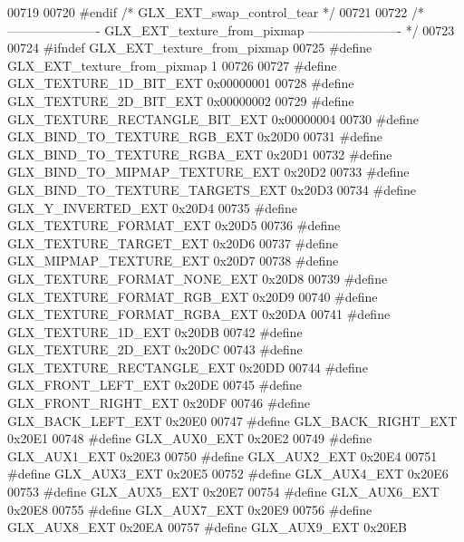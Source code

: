 \begin{DoxyCode}
00719 
00720 \textcolor{preprocessor}{#endif }\textcolor{comment}{/* GLX\_EXT\_swap\_control\_tear */}\textcolor{preprocessor}{}
00721 
00722 \textcolor{comment}{/* ---------------------- GLX\_EXT\_texture\_from\_pixmap ---------------------- */}
00723 
00724 \textcolor{preprocessor}{#ifndef GLX\_EXT\_texture\_from\_pixmap}
00725 \textcolor{preprocessor}{#define GLX\_EXT\_texture\_from\_pixmap 1}
00726 
00727 \textcolor{preprocessor}{#define GLX\_TEXTURE\_1D\_BIT\_EXT 0x00000001}
00728 \textcolor{preprocessor}{#define GLX\_TEXTURE\_2D\_BIT\_EXT 0x00000002}
00729 \textcolor{preprocessor}{#define GLX\_TEXTURE\_RECTANGLE\_BIT\_EXT 0x00000004}
00730 \textcolor{preprocessor}{#define GLX\_BIND\_TO\_TEXTURE\_RGB\_EXT 0x20D0}
00731 \textcolor{preprocessor}{#define GLX\_BIND\_TO\_TEXTURE\_RGBA\_EXT 0x20D1}
00732 \textcolor{preprocessor}{#define GLX\_BIND\_TO\_MIPMAP\_TEXTURE\_EXT 0x20D2}
00733 \textcolor{preprocessor}{#define GLX\_BIND\_TO\_TEXTURE\_TARGETS\_EXT 0x20D3}
00734 \textcolor{preprocessor}{#define GLX\_Y\_INVERTED\_EXT 0x20D4}
00735 \textcolor{preprocessor}{#define GLX\_TEXTURE\_FORMAT\_EXT 0x20D5}
00736 \textcolor{preprocessor}{#define GLX\_TEXTURE\_TARGET\_EXT 0x20D6}
00737 \textcolor{preprocessor}{#define GLX\_MIPMAP\_TEXTURE\_EXT 0x20D7}
00738 \textcolor{preprocessor}{#define GLX\_TEXTURE\_FORMAT\_NONE\_EXT 0x20D8}
00739 \textcolor{preprocessor}{#define GLX\_TEXTURE\_FORMAT\_RGB\_EXT 0x20D9}
00740 \textcolor{preprocessor}{#define GLX\_TEXTURE\_FORMAT\_RGBA\_EXT 0x20DA}
00741 \textcolor{preprocessor}{#define GLX\_TEXTURE\_1D\_EXT 0x20DB}
00742 \textcolor{preprocessor}{#define GLX\_TEXTURE\_2D\_EXT 0x20DC}
00743 \textcolor{preprocessor}{#define GLX\_TEXTURE\_RECTANGLE\_EXT 0x20DD}
00744 \textcolor{preprocessor}{#define GLX\_FRONT\_LEFT\_EXT 0x20DE}
00745 \textcolor{preprocessor}{#define GLX\_FRONT\_RIGHT\_EXT 0x20DF}
00746 \textcolor{preprocessor}{#define GLX\_BACK\_LEFT\_EXT 0x20E0}
00747 \textcolor{preprocessor}{#define GLX\_BACK\_RIGHT\_EXT 0x20E1}
00748 \textcolor{preprocessor}{#define GLX\_AUX0\_EXT 0x20E2}
00749 \textcolor{preprocessor}{#define GLX\_AUX1\_EXT 0x20E3}
00750 \textcolor{preprocessor}{#define GLX\_AUX2\_EXT 0x20E4}
00751 \textcolor{preprocessor}{#define GLX\_AUX3\_EXT 0x20E5}
00752 \textcolor{preprocessor}{#define GLX\_AUX4\_EXT 0x20E6}
00753 \textcolor{preprocessor}{#define GLX\_AUX5\_EXT 0x20E7}
00754 \textcolor{preprocessor}{#define GLX\_AUX6\_EXT 0x20E8}
00755 \textcolor{preprocessor}{#define GLX\_AUX7\_EXT 0x20E9}
00756 \textcolor{preprocessor}{#define GLX\_AUX8\_EXT 0x20EA}
00757 \textcolor{preprocessor}{#define GLX\_AUX9\_EXT 0x20EB}

\end{DoxyCode}
